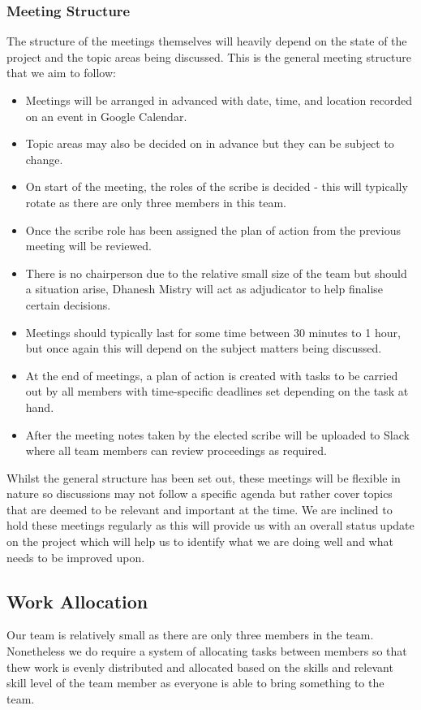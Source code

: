 \documentclass{article}
\begin{document}
\subsubsection{Meeting Structure}
The structure of the meetings themselves will heavily depend on the state of the project and the topic areas being discussed. This is the general meeting structure that we aim to follow:
\begin{itemize}
    \item Meetings will be arranged in advanced with date, time, and location recorded on an event in Google Calendar.
    \item Topic areas may also be decided on in advance but they can be subject to change.
    \item On start of the meeting, the roles of the scribe is decided - this will typically rotate as there are only three members in this team.
    \item Once the scribe role has been assigned the plan of action from the previous meeting will be reviewed.
    \item There is no chairperson due to the relative small size of the team but should a situation arise, Dhanesh Mistry will act as adjudicator to help finalise certain decisions.
    \item Meetings should typically last for some time between 30 minutes to 1 hour, but once again this will depend on the subject matters being discussed.
    \item At the end of meetings, a plan of action is created with tasks to be carried out by all members with time-specific deadlines set depending on the task at hand.
    \item After the meeting  notes taken by the elected scribe will be uploaded to Slack where all team members can review proceedings as required.
\end{itemize}
Whilst the general structure has been set out, these meetings will be flexible in nature so discussions may not follow a specific agenda but rather cover topics that are deemed to be relevant and important at the time. We are inclined to hold these meetings regularly as this will provide us with an overall status update on the project which will help us to identify what we are doing well and what needs to be improved upon.
\subsection{Work Allocation}
Our team is relatively small as there are only three members in the team. Nonetheless we do require a system of allocating tasks between members so that thew work is evenly distributed and allocated based on the skills and relevant skill level of the team member as everyone is able to bring something to the team. 
\end{document}
